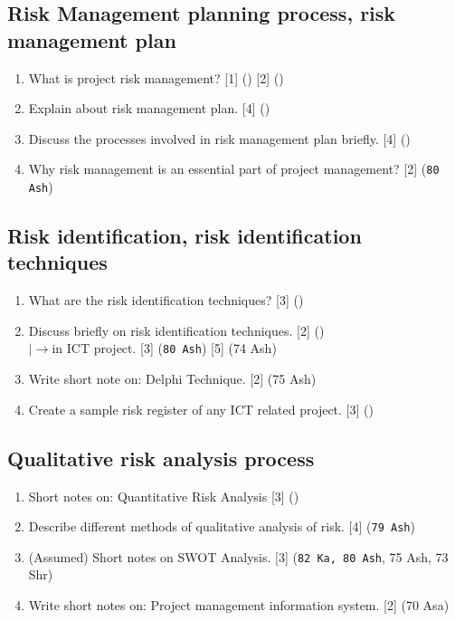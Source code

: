 \documentclass[12pt]{article}
\newcommand{\lb}{\\$\left|\rightarrow\right.$}
\begin{document}
  \subsection{Risk Management planning process, risk management plan}
    \begin{enumerate}
      \item What is project risk management? \hfill [1] () [2] ()

      \item Explain about risk management plan. \hfill [4] ()

      \item Discuss the processes involved in risk management plan briefly. \hfill [4] ()

      \item Why risk management is an essential part of project management? \hfill [2] (\texttt{80 Ash})
    \end{enumerate}

  \subsection{Risk identification, risk identification techniques}
    \begin{enumerate}
      \item What are the risk identification techniques? \hfill [3] ()

      \item Discuss briefly on risk identification techniques. \hfill [2] ()
        \lb in ICT project. \hfill [3] (\texttt{80 Ash}) [5] (74 Ash)

      \item Write short note on: Delphi Technique. \hfill [2] (75 Ash)
      
      \item Create a sample risk register of any ICT related project. \hfill [3] ()
    \end{enumerate}

  \subsection{Qualitative risk analysis process}
    \begin{enumerate}
      \item Short notes on: Quantitative Risk Analysis \hfill [3] ()

      \item Describe different methods of qualitative analysis of risk. \hfill [4] (\texttt{79 Ash})

      \item (Assumed) Short notes on SWOT Analysis. \hfill [3] (\texttt{82 Ka, 80 Ash}, 75 Ash, 73 Shr)

      \item Write short notes on: Project management information system. \hfill [2] (70 Asa)
    \end{enumerate}
\end{document}
